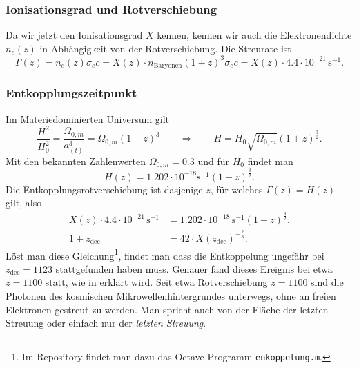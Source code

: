 \subsubsection{Ionisationsgrad und Rotverschiebung}
Da wir jetzt den Ionisationsgrad $X$ kennen, kennen wir auch die
Elektronendichte $n_e(z)$ in Abhängigkeit von der Rotverschiebung.
Die Streurate ist
\[
\Gamma(z)
=
n_e(z)\sigma_e c
=
X(z)\cdot n_{\text{Baryonen}} (1+z)^3 \sigma_e c
=
X(z)\cdot 4.4\cdot 10^{-21}\,\text{s}^{-1}.
\]

\subsubsection{Entkopplungszeitpunkt}
Im Materiedominierten Universum gilt
\[
\frac{H^2}{H_0^2}
=
\frac{\Omega_{0,m}}{a_(t)^3}
=
\Omega_{0,m}(1+z)^3
\qquad\Rightarrow\qquad
H
=
H_0\sqrt{\Omega_{0,m}} (1+z)^{\frac32}.
\]
Mit den bekannten Zahlenwerten $\Omega_{0,m}=0.3$ und für $H_0$
findet man
\begin{equation}
H(z)
=
1.202\cdot 10^{-18}\text{s}^{-1} (1+z)^{\frac32}.
\label{skript:cmb:Hz}
\end{equation}
Die Entkopplungsrotverschiebung ist dasjenige $z$, für welches
$\Gamma(z)=H(z)$ gilt, also
\begin{align*}
X(z)\cdot 4.4\cdot 10^{-21} \,\text{s}^{-1}
&=
1.202\cdot 10^{-18}\,\text{s}^{-1} (1+z)^{\frac32}.
\\
1+z_{\text{dec}}
&=
42\cdot X(z_{\text{dec}})^{-\frac23}.
\end{align*}
Löst man diese Gleichung\footnote{Im Repository findet man dazu das
Octave-Programm \texttt{enkoppelung.m}.},
findet man dass die Entkoppelung ungefähr
bei $z_{\text{dec}}=1123$ stattgefunden haben muss.
Genauer
fand dieses Ereignis bei etwa $z=1100$ statt, wie in
\cite[S.~149]{skript:ryden} erklärt wird.
Seit etwa Rotverschiebung $z=1100$ sind die Photonen des kosmischen
Mikrowellenhintergrundes unterwegs, ohne an freien Elektronen gestreut
zu werden.
Man spricht auch von der Fläche der letzten Streuung oder einfach nur
der {\em letzten Streuung}.
%

